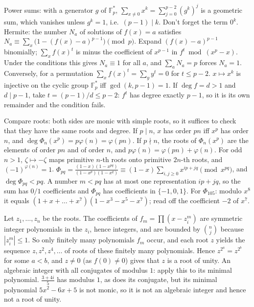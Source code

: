 \documentclass[11pt,a4paper]{article}
\begin{document}

 Power sums: with a generator $g$ of $\mathbb{F}_p^*$, $\sum_{x\ne0}x^k=\sum_{j=0}^{p-2}(g^k)^j$ is a geometric sum, which vanishes unless $g^k=1$, i.e.\ $(p-1)\mid k$. Don't forget the term $0^k$.
 Hermite: the number $N_a$ of solutions of $f(x)=a$ satisfies $N_a\equiv\sum_x\bigl(1-(f(x)-a)^{p-1}\bigr)\pmod p$. Expand $(f(x)-a)^{p-1}$ binomially; $\sum_xf(x)^t$ is minus the coefficient of $x^{p-1}$ in $f^t\bmod(x^p-x)$. Under the conditions this gives $N_a\equiv1$ for all $a$, and $\sum_aN_a=p$ forces $N_a=1$. Conversely, for a permutation $\sum_xf(x)^t=\sum_yy^t=0$ for $t\le p-2$.
 $x\mapsto x^k$ is injective on the cyclic group $\mathbb{F}_p^*$ iff $\gcd(k,p-1)=1$. If $\deg f=d>1$ and $d\mid p-1$, take $t=(p-1)/d\le p-2$: $f^t$ has degree exactly $p-1$, so it is its own remainder and the condition fails.

 Compare roots: both sides are monic with simple roots, so it suffices to check that they have the same roots and degree. If $p\mid n$, $x$ has order $pn$ iff $x^p$ has order $n$, and $\deg\Phi_n(x^p)=p\varphi(n)=\varphi(pn)$.
 If $p\nmid n$, the roots of $\Phi_n(x^p)$ are the elements of order $pn$ and of order $n$, and $p\varphi(n)=\varphi(pn)+\varphi(n)$. For odd $n>1$, $\zeta\mapsto-\zeta$ maps primitive $n$-th roots onto primitive $2n$-th roots, and $(-1)^{\varphi(n)}=1$.
 $\Phi_{pq}=\frac{(1-x)(1-x^{pq})}{(1-x^p)(1-x^q)}\equiv(1-x)\sum_{i,j\ge0}x^{ip+jq}\pmod{x^{pq}}$, and $\deg\Phi_{pq}<pq$. A number $m<pq$ has at most one representation $ip+jq$, so the sum has $0/1$ coefficients and $\Phi_{pq}$ has coefficients in $\{-1,0,1\}$. For $\Phi_{105}$: modulo $x^8$ it equals $(1+x+\dots+x^7)(1-x^3-x^5-x^7)$; read off the coefficient $-2$ of $x^7$.

 Let $z_1,\dots,z_n$ be the roots. The coefficients of $f_m=\prod(x-z_i^m)$ are symmetric integer polynomials in the $z_i$, hence integers, and are bounded by $\binom nj$ because $|z_i^m|\le1$.
 So only finitely many polynomials $f_m$ occur, and each root $z$ yields the sequence $z,z^2,z^4,\dots$ of roots of these finitely many polynomials. Hence $z^{2^a}=z^{2^b}$ for some $a<b$, and $z\ne0$ (as $f(0)\ne0$) gives that $z$ is a root of unity.
 An algebraic integer with all conjugates of modulus $1$: apply this to its minimal polynomial. $\frac{3+4i}5$ has modulus $1$, as does its conjugate, but its minimal polynomial $5x^2-6x+5$ is not monic, so it is not an algebraic integer and hence not a root of unity.
\end{document}
